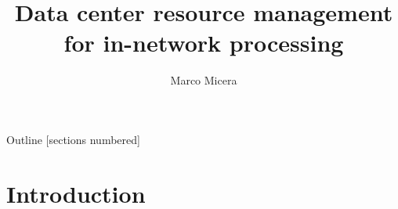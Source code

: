 

\title{Data center resource management for in-network processing}
\date{} %
\author{Marco Micera}



\maketitle

\begin{frame}{Outline}
  [sections numbered]
  \tableofcontents[hideallsubsections]
\end{frame}

\section{Introduction}

